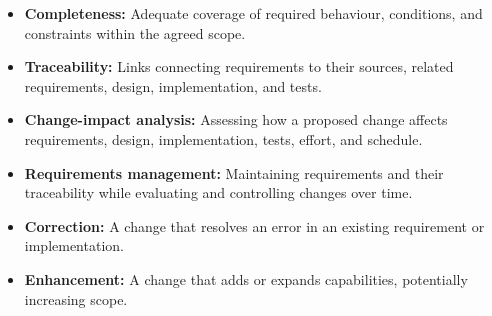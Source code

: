\documentclass[11pt]{article}
\newenvironment{DottedList}{%
  \begin{itemize}[leftmargin=2em, itemsep=0.35em, topsep=0.35em, label=\textbullet]
}{%
  \end{itemize}
}
\begin{document}
\begin{DottedList}
  \item \textbf{Completeness:} Adequate coverage of required behaviour, conditions, and constraints within the agreed scope.
  \item \textbf{Traceability:} Links connecting requirements to their sources, related requirements, design, implementation, and tests.
  \item \textbf{Change-impact analysis:} Assessing how a proposed change affects requirements, design, implementation, tests, effort, and schedule.
  \item \textbf{Requirements management:} Maintaining requirements and their traceability while evaluating and controlling changes over time.
  \item \textbf{Correction:} A change that resolves an error in an existing requirement or implementation.
  \item \textbf{Enhancement:} A change that adds or expands capabilities, potentially increasing scope.
\end{DottedList}
\newpage
\end{document}
